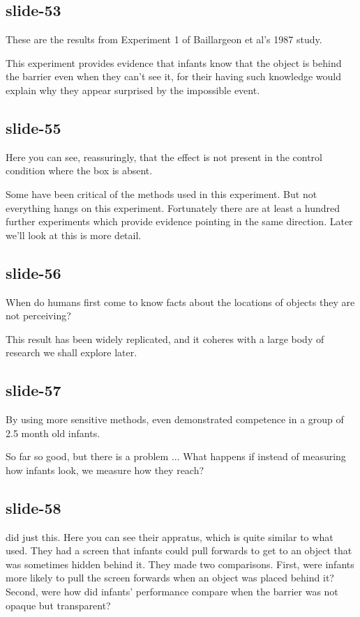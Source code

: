 \documentclass[12pt,\papersize]{extarticle}
\begin{document}
\subsection{slide-53}
These are the results from Experiment 1 of Baillargeon et al's 1987 study.
 
This experiment provides evidence that infants know that the object is behind the barrier even when they can't see it, for their having such knowledge would explain why they appear surprised by the impossible event.
 
 
 
\subsection{slide-55}
Here you can see, reassuringly, that the effect is not present in the control condition where the box is absent.
 
Some have been critical of the methods used in this experiment. But not everything hangs on this experiment. Fortunately there are at least a hundred further experiments which provide evidence pointing in the same direction. Later we'll look at this is more detail.
 
 
 
\subsection{slide-56}
When do humans first come to know facts about the locations of objects they are not perceiving?
 
This result has been widely replicated, and it coheres with a large body of research we shall explore later.
 
 
 
\subsection{slide-57}
By using more sensitive methods, \citet{Aguiar:1999jq} even demonstrated competence in a group of 2.5 month old infants.
 
So far so good, but there is a problem ... What happens if instead of measuring how infants look, we measure how they reach?
 
 
 
\subsection{slide-58}
\citet{Shinskey:2001fk} did just this. Here you can see their appratus, which is quite similar to what \citet{baillargeon:1987_object} used. They had a screen that infants could pull forwards to get to an object that was sometimes hidden behind it. They made two comparisons. First, were infants more likely to pull the screen forwards when an object was placed behind it? Second, were how did infants' performance compare when the barrier was not opaque but transparent?
 
\end{document}
